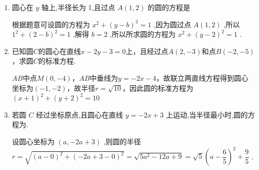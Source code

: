 \begin{enumerate}
\begin{enumerate}
\begin{jieda}
        \end{jieda}
        \item 圆心在 $y$ 轴上,半径长为 1,且过点 $A\left( {1,2}\right)$ 的圆的方程是
        \begin{jieda}
            根据题意可设圆的方程为 ${x}^{2} + {\left( y - b\right) }^{2} = 1$ ,因为圆过点 $A\left( {1,2}\right)$ ,所以 ${1}^{2} + {\left( 2 - b\right) }^{2} = 1$ ,解得 $b = 2$ ,所以所求圆的方程为 ${x}^{2} + {\left( y - 2\right) }^{2} = 1$ .
        \end{jieda}
            
        \item 已知圆$C$的圆心在直线$x-2y-3=0$上，且经过点$A(2, -3)$和点$B(-2, -5)$，求圆$C$的标准方程.
        \begin{jieda}
            $AB$中点$M(0, -4)$，$AB$中垂线为$y = -2x-4$，故联立两直线方程得到圆心坐标为$(-1, -2)$，故半径$r = \sqrt{10}$，因此圆的标准方程为$(x+1)^2+(y+2)^2 = 10$
        \end{jieda}
        \item 若圆 $C$ 经过坐标原点,且圆心在直线 $y =  - {2x} + 3$ 上运动,当半径最小时,圆的方程为.
        \begin{jieda}
            设圆心坐标为 $\left( {a, - {2a} + 3}\right)$ ,则圆的半径 $r = \sqrt{{\left( a - 0\right) }^{2} + {\left( -2a + 3 - 0\right) }^{2}} = \sqrt{5{a}^{2} - {12a} + 9} = \sqrt{5}{\left( a - \dfrac{6}{5}\right) }^{2} + \dfrac{9}{5}$ .
            

\end{jieda}
\end{enumerate}
\end{enumerate}
